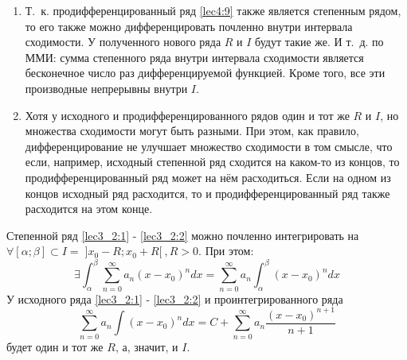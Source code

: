 \documentclass[../../main.tex]{subfiles}
\begin{document}
\begin{rems}
	\;
	
	\begin{enumerate}
		\item Т.~к. продифференцированный ряд \eqref{lec4:9} также 
		является степенным рядом, то его также можно дифференцировать
		почленно внутри интервала сходимости. У полученного нового 
		ряда $R$ и $I$ будут такие же. И т.~д. по ММИ: сумма 
		степенного ряда внутри интервала сходимости является 
		бесконечное число раз дифференцируемой функцией. Кроме 
		того, все эти производные непрерывны внутри $I$.
		
		\item Хотя у исходного и продифференцированного рядов один
		и тот же $R$ и $I$, но множества сходимости могут быть разными.
		При этом, как правило, дифференцирование не улучшает
		множество сходимости в том смысле, что если, например, 
		исходный степенной ряд сходится на каком-то из концов, то
		продифференцированный ряд может на нём расходиться. 
		Если на одном из концов исходный ряд расходится, 
		то и продифференцированный ряд также расходится на этом конце. 
	\end{enumerate}
\end{rems}

\begin{thm}
	Степенной ряд \eqref{lec3_2:1} - \eqref{lec3_2:2} можно почленно 
	интегрировать на $\forall [\alpha; \beta] \subset I = \;
	]x_0 - R;x_0 + R[ \:, R > 0 $. При этом:
	\begin{equation} \label{lec4:11}
		\exists \int_{\alpha}^{\beta} \sum\limits_{n = 0}^{\infty}
		a_n(x - x_0)^n dx = \sum\limits_{n = 0}^{\infty} a_n
		\int_{\alpha}^{\beta} (x - x_0)^n dx
	\end{equation}
	У исходного ряда \eqref{lec3_2:1} - \eqref{lec3_2:2} и проинтегрированного
	ряда 
	\begin{equation} \label{lec4:12}
		\sum\limits_{n = 0}^{\infty} a_n \int (x - x_0)^n dx =
		C + \sum\limits_{n = 0}^{\infty} a_n 
		\dfrac{ (x - x_0)^{n + 1} }{n + 1}
	\end{equation}
	будет один и тот же $R$, а, значит, и $I$. 
\end{thm}
\end{document}
